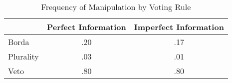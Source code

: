 \begin{table}[h!]
\begin{center}
\caption{Frequency of Manipulation by Voting Rule}
\label{table:frequencies}
\begin{tabular}{lcc}
\multicolumn{1}{c}{} & \multicolumn{1}{c}{Perfect Information} & \multicolumn{1}{c}{Imperfect Information} \\
\hline
Borda     & .20 & .17 \\
Plurality & .03 & .01 \\
Veto      & .80 & .80 \\
\end{tabular}
\end{center}
\end{table}
